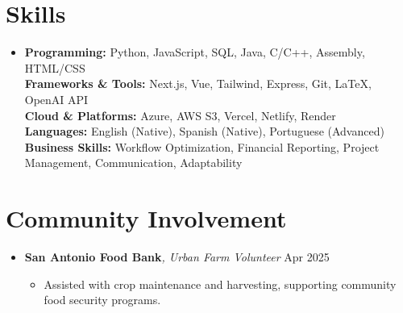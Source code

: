 \documentclass[letterpaper,10pt]{article}
\newcommand{\resumeItem}[1]{\item \small{#1}}
\begin{document}
\section*{Skills}
\begin{itemize}[leftmargin=0in]
  \item[]
    \textbf{Programming:} Python, JavaScript, SQL, Java, C/C++, Assembly, HTML/CSS \\
    \textbf{Frameworks \& Tools:} Next.js, Vue, Tailwind, Express, Git, LaTeX, OpenAI API \\
    \textbf{Cloud \& Platforms:} Azure, AWS S3, Vercel, Netlify, Render \\
    \textbf{Languages:} English (Native), Spanish (Native), Portuguese (Advanced) \\
    \textbf{Business Skills:} Workflow Optimization, Financial Reporting, Project Management, Communication, Adaptability
\end{itemize}


\section*{Community Involvement}
\begin{itemize}
  \item[] 
  \textbf{San Antonio Food Bank}\textit{, Urban Farm Volunteer} \hfill Apr 2025
  \begin{itemize}[leftmargin=0.15in]
    \resumeItem{Assisted with crop maintenance and harvesting, supporting community food security programs.}
  \end{itemize}
\end{itemize}
\end{document}
